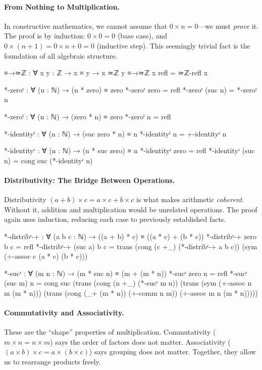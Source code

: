 \documentclass[11pt,a4paper]{book}
\begin{document}
\paragraph{From Nothing to Multiplication.}
In constructive mathematics, we cannot assume that $0 \times n = 0$---we must \emph{prove} it. 
The proof is by induction: $0 \times 0 = 0$ (base case), and $0 \times (n+1) = 0 \times n + 0 = 0$ (inductive step).
This seemingly trivial fact is the foundation of all algebraic structure.

\begin{code}
≡→≃ℤ : ∀ {x y : ℤ} → x ≡ y → x ≃ℤ y
≡→≃ℤ {x} refl = ≃ℤ-refl x

*-zeroʳ : ∀ (n : ℕ) → (n * zero) ≡ zero
*-zeroʳ zero    = refl
*-zeroʳ (suc n) = *-zeroʳ n

*-zeroˡ : ∀ (n : ℕ) → (zero * n) ≡ zero
*-zeroˡ n = refl

*-identityˡ : ∀ (n : ℕ) → (suc zero * n) ≡ n
*-identityˡ n = +-identityʳ n

*-identityʳ : ∀ (n : ℕ) → (n * suc zero) ≡ n
*-identityʳ zero = refl
*-identityʳ (suc n) = cong suc (*-identityʳ n)
\end{code}

\paragraph{Distributivity: The Bridge Between Operations.}
Distributivity $(a + b) \times c = a \times c + b \times c$ is what makes arithmetic \emph{coherent}. 
Without it, addition and multiplication would be unrelated operations. The proof again uses induction,
reducing each case to previously established facts.

\begin{code}
*-distribʳ-+ : ∀ (a b c : ℕ) → ((a + b) * c) ≡ ((a * c) + (b * c))
*-distribʳ-+ zero    b c = refl
*-distribʳ-+ (suc a) b c = 
  trans (cong (c +_) (*-distribʳ-+ a b c)) 
        (sym (+-assoc c (a * c) (b * c)))

*-sucʳ : ∀ (m n : ℕ) → (m * suc n) ≡ (m + (m * n))
*-sucʳ zero    n = refl
*-sucʳ (suc m) n = cong suc (trans (cong (n +_) (*-sucʳ m n))
                     (trans (sym (+-assoc n m (m * n)))
                     (trans (cong (_+ (m * n)) (+-comm n m))
                     (+-assoc m n (m * n)))))
\end{code}

\paragraph{Commutativity and Associativity.}
These are the ``shape'' properties of multiplication. Commutativity ($m \times n = n \times m$) 
says the order of factors does not matter. Associativity ($(a \times b) \times c = a \times (b \times c)$) 
says grouping does not matter. Together, they allow us to rearrange products freely.
\end{document}

